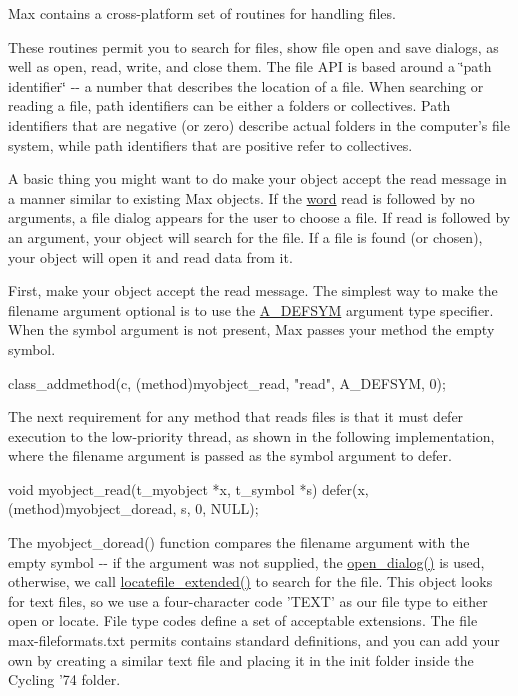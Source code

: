 Max contains a cross-\/platform set of routines for handling files.

These routines permit you to search for files, show file open and save dialogs, as well as open, read, write, and close them. The file API is based around a \char`\"{}path identifier\char`\"{} -\/-\/ a number that describes the location of a file. When searching or reading a file, path identifiers can be either a folders or collectives. Path identifiers that are negative (or zero) describe actual folders in the computer's file system, while path identifiers that are positive refer to collectives.

A basic thing you might want to do make your object accept the read message in a manner similar to existing Max objects. If the \hyperlink{unionword}{word} read is followed by no arguments, a file dialog appears for the user to choose a file. If read is followed by an argument, your object will search for the file. If a file is found (or chosen), your object will open it and read data from it.

First, make your object accept the read message. The simplest way to make the filename argument optional is to use the \hyperlink{group__atom_gga8aa6700e9f00b132eb376db6e39ade47aa010616276cb89bcd04bcba611e18d51}{A\_\-DEFSYM} argument type specifier. When the symbol argument is not present, Max passes your method the empty symbol.


\begin{DoxyCode}
        class_addmethod(c, (method)myobject_read, "read", A_DEFSYM, 0);
\end{DoxyCode}


The next requirement for any method that reads files is that it must defer execution to the low-\/priority thread, as shown in the following implementation, where the filename argument is passed as the symbol argument to defer.


\begin{DoxyCode}
    void myobject_read(t_myobject *x, t_symbol *s)
    {
        defer(x, (method)myobject_doread, s, 0, NULL);
    }
\end{DoxyCode}


The myobject\_\-doread() function compares the filename argument with the empty symbol -\/-\/ if the argument was not supplied, the \hyperlink{group__files_ga0d8fd0b13e2e623298a45e846af3fe1a}{open\_\-dialog()} is used, otherwise, we call \hyperlink{group__files_gaa2899b66e1457da0ee333f9407230ccd}{locatefile\_\-extended()} to search for the file. This object looks for text files, so we use a four-\/character code 'TEXT' as our file type to either open or locate. File type codes define a set of acceptable extensions. The file max-\/fileformats.txt permits contains standard definitions, and you can add your own by creating a similar text file and placing it in the init folder inside the Cycling '74 folder.


